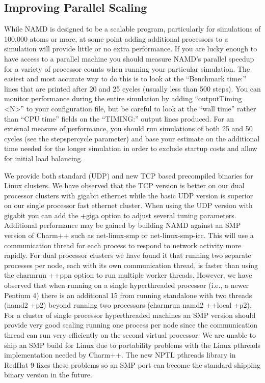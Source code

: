 \subsection{Improving Parallel Scaling}

While NAMD is designed to be a scalable program, particularly for
simulations of 100,000 atoms or more, at some point adding additional
processors to a simulation will provide little or no extra performance.
If you are lucky enough to have access to a parallel machine you should
measure NAMD's parallel speedup for a variety of processor counts when
running your particular simulation.  The easiest and most accurate way
to do this is to look at the ``Benchmark time:'' lines that are printed
after 20 and 25 cycles (usually less than 500 steps).  You can monitor
performance during the entire simulation by adding ``outputTiming <N>''
to your configuration file, but be careful to look at the ``wall time''
rather than ``CPU time'' fields on the ``TIMING:'' output lines produced.
For an external measure of performance, you should run simulations of
both 25 and 50 cycles (see the stepspercycle parameter) and base your
estimate on the additional time needed for the longer simulation in
order to exclude startup costs and allow for initial load balancing.

We provide both standard (UDP) and new TCP based precompiled binaries
for Linux clusters.  We have observed that the TCP version is better
on our dual processor clusters with gigabit ethernet while the basic
UDP version is superior on our single processor fast ethernet cluster.
When using the UDP version with gigabit you can add the +giga option
to adjust several tuning parameters.  Additional performance may be
gained by building NAMD against an SMP version of Charm++ such as
net-linux-smp or net-linux-smp-icc.  This will use a communication
thread for each process to respond to network activity more rapidly.
For dual processor clusters we have found it that running two separate
processes per node, each with its own communication thread, is faster
than using the charmrun ++ppn option to run multiple worker threads.
However, we have observed that when running on a single hyperthreaded
processor (i.e., a newer Pentium 4) there is an additional 15%
from running standalone with two threads (namd2 +p2) beyond running
two processors (charmrun namd2 ++local +p2).  For a cluster of single
processor hyperthreaded machines an SMP version should provide very
good scaling running one process per node since the communication
thread can run very efficiently on the second virtual processor.  We
are unable to ship an SMP build for Linux due to portability problems
with the Linux pthreads implementation needed by Charm++.  The new
NPTL pthreads library in RedHat 9 fixes these problems so an SMP port
can become the standard shipping binary version in the future.

